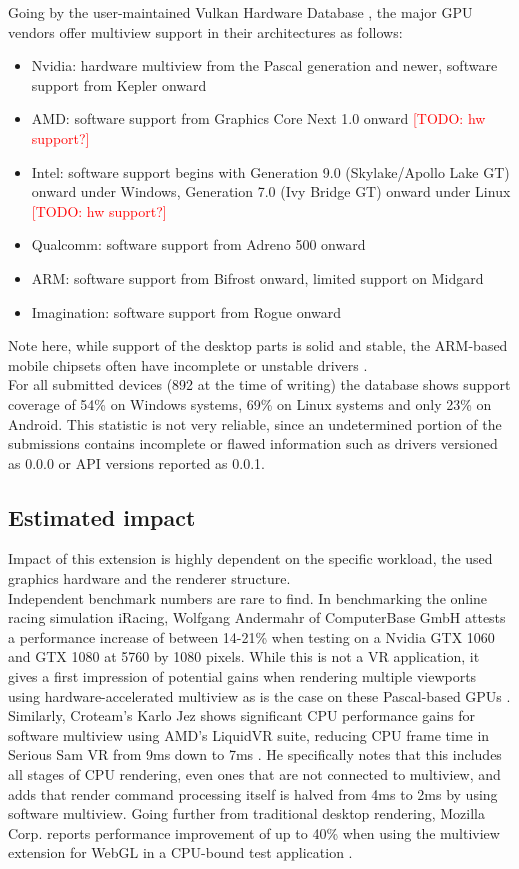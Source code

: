 Going by the user-maintained Vulkan Hardware Database \cite{Willems.2020}, the major GPU vendors offer multiview support in their architectures as follows: 
\begin{itemize}
\item Nvidia: hardware multiview from the Pascal generation and newer, software support from Kepler onward
\item AMD: software support from Graphics Core Next 1.0 onward \textcolor{red}{[TODO: hw support?]}
\item Intel: software support begins with Generation 9.0 (Skylake/Apollo Lake GT) onward under Windows, Generation 7.0 (Ivy Bridge GT) onward under Linux \textcolor{red}{[TODO: hw support?]}
\item Qualcomm: software support from Adreno 500 onward
\item ARM: software support from Bifrost onward, limited support on Midgard
\item Imagination: software support from Rogue onward
\end{itemize}
Note here, while support of the desktop parts is solid and stable, the ARM-based mobile chipsets often have incomplete or unstable drivers \cite{Willems.2019}\cite{JMC47.2018}. \\
For all submitted devices (892 at the time of writing) the database shows support coverage of 54\% on Windows systems, 69\% on Linux systems and only 23\% on Android. This statistic is not very reliable, since an undetermined portion of the submissions contains incomplete or flawed information such as drivers versioned as 0.0.0 or API versions reported as 0.0.1. 

\subsection{Estimated impact}
Impact of this extension is highly dependent on the specific workload, the used graphics hardware and the renderer structure. \\
Independent benchmark numbers are rare to find. In benchmarking the online racing simulation iRacing, Wolfgang Andermahr of ComputerBase GmbH attests a performance increase of between 14-21\% when testing on a Nvidia GTX 1060 and GTX 1080 at 5760 by 1080 pixels. While this is not a VR application, it gives a first impression of potential gains when rendering multiple viewports using hardware-accelerated multiview as is the case on these Pascal-based GPUs \cite{Andermahr.2016}.
Similarly, Croteam's Karlo Jez shows significant CPU performance gains for software multiview using AMD's LiquidVR suite, reducing CPU frame time in Serious Sam VR from 9ms down to 7ms \cite{Jez.2017}. He specifically notes that this includes all stages of CPU rendering, even ones that are not connected to multiview, and adds that render command processing itself is halved from 4ms to 2ms by using software multiview. 
Going further from traditional desktop rendering, Mozilla Corp. reports performance improvement of up to 40\% when using the multiview extension for WebGL in a CPU-bound test application \cite{Serrano.2019}. 

